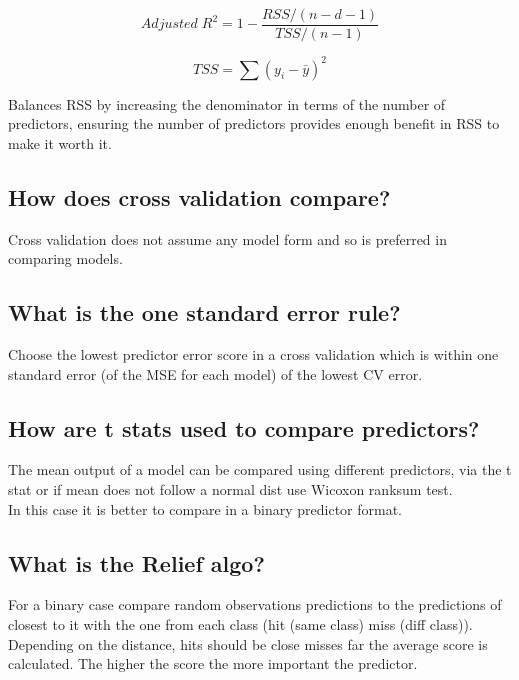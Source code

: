 \documentclass[11pt]{scrartcl} %
\begin{document}
\begin{equation}
	Adjusted\; R^2 = 1 - \frac{RSS/(n-d-1)}{TSS/(n-1)}
\end{equation}

\begin{equation}
	TSS = \sum{(y_i - \bar{y})^2}
\end{equation}

Balances RSS by increasing the denominator in terms of the number of predictors, ensuring
the number of predictors provides enough benefit in RSS to make it worth it.

\subsection{How does cross validation compare?}

Cross validation does not assume any model form and so is preferred in comparing models.

\subsection{What is the one standard error rule?}

Choose the lowest predictor error score in a cross validation which is within one standard error (of the MSE for each model)
of the lowest CV error.

\subsection{How are t stats used to compare predictors?}

The mean output of a model can be compared using different predictors, via the t stat or if mean does not
follow a normal dist use Wicoxon ranksum test.\\

In this case it is better to compare in a binary predictor format.

\subsection{What is the Relief algo?}

For a binary case compare random observations predictions to the predictions of closest to it with the
one from each class (hit (same class) miss (diff class)). Depending on the distance, hits should be close
misses far the average score is calculated. The higher the score the more important the predictor.
\end{document}
